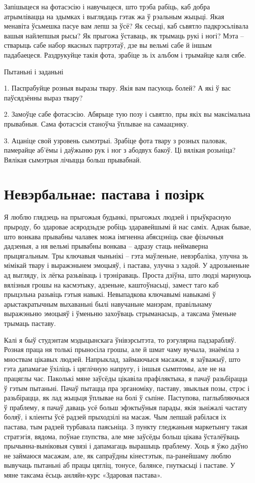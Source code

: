 Запішыцеся на фотасэсію і навучыцеся, што трэба рабіць, каб добра атрымлівацца на здымках і выглядаць гэтак жа ў рэальным жыцьці. Якая менавіта ўсьмешка пасуе вам лепш за ўсё? Як сесьці, каб сьвятло падкрэсьлівала вашыя найлепшыя рысы? Як прыгожа ўставаць, як трымаць рукі і ногі? Мэта – стварыць сабе набор якасных партрэтаў, дзе вы вельмі сабе й іншым падабаецеся. Раздрукуйце такія фота, зрабіце зь іх альбом і трымайце каля сябе.

Пытаньні і заданьні

1. Паспрабуйце розныя выразы твару. Якія вам пасуюць болей? А які ў вас паўсядзённы выраз твару?

2. Замоўце сабе фотасэсію. Абярыце тую позу і сьвятло, пры якіх вы максімальна прывабныя. Сама фотасэсія станоўча ўплывае на самаацэнку.

3. Ацаніце свой узровень сымэтрыі. Зрабіце фота твару з розных паловак, памерайце аб'ёмы і даўжыню рук і ног з абодвух бакоў. Ці вялікая розьніца? Вялікая сымэтрыя лічыцца больш прывабнай.


\section{Невэрбальнае: пастава і позірк}

Я люблю глядзець на прыгожыя будынкі, прыгожых людзей і прыўкрасную прыроду, бо здаровае асяродзьдзе робіць здаравейшымі й нас саміх. Аднак бывае, што вонкава прывабны чалавек можа імгненна абясцэніць свае фізычныя дадзеныя, а ня вельмі прывабны вонкава – адразу стаць неймаверна прыцягальным. Тры ключавыя чыньнікі – гэта маўленьне, невэрбаліка, улучна зь мімікай твару і выражэньнем эмоцыяў, і пастава, улучна з хадой. У адрозьненьне ад выгляду, іх лёгка разьвіваць і трэніраваць. Проста дзіўна, што людзі марнуюць вялізныя грошы на касмэтыку, адзеньне, каштоўнасьці, замест таго каб прыцэльна разьвіць гэтыя навыкі. Невыпадкова ключавымі навыкамі ў арыстакратычным выхаваньні былі навучаньне манэрам, правільнаму выражэньню эмоцыяў і ўменьню захоўваць стрыманасьць, а таксама ўменьне трымаць паставу.

Калі я быў студэнтам мэдыцынскага ўнівэрсытэта, то рэгулярна падзарабляў. Розная праца ня толькі прыносіла грошы, але й шмат чаму вучыла, знаёміла з мноствам цікавых людзей. Напрыклад, займаючыся масажам, я заўважыў, што гэта дапамагае ўхіліць і цяглічную напругу, і іншыя сымптомы, але не на працяглы час. Паколькі мяне заўсёды цікавіла прафіляктыка, я пачаў разьбірацца ў гэтым пытаньні. Пачаў пытацца пра эрганоміку, паставу, звыклыя позы, стрэс і разьбірацца, як лад жыцьця ўплывае на болі ў сьпіне. Паступова, паглыбляючыся ў праблему, я пачаў даваць усё больш эфэктыўныя парады, якія зьніжалі частату боляў, і кліенты ўсё радзей прыходзілі на масаж. Чым лепшай рабілася іх пастава, тым радзей турбавала паясьніца. З пункту гледжаньня маркетынгу такая стратэгія, вядома, поўнае глупства, але мне заўсёды больш цікава ўсталёўваць прычынна-выніковыя сувязі і дапамагаць вырашыць праблему. Хоць я ўжо даўно не займаюся масажам, але, як сапраўдны кінестэтык, па-ранейшаму люблю вывучаць пытаньні аб працы цягліц, тонусе, балянсе, гнуткасьці і паставе. У мяне таксама ёсьць анляйн-курс «Здаровая пастава».

